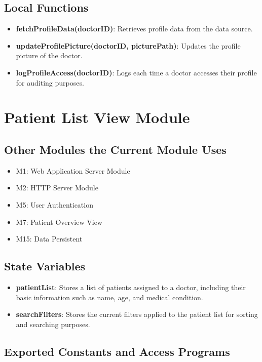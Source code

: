 \documentclass[12pt, titlepage]{article}
\begin{document}
\subsection{Local Functions}
\begin{itemize}
\item \textbf{fetchProfileData(doctorID)}: Retrieves profile data from the data source.
\item \textbf{updateProfilePicture(doctorID, picturePath)}: Updates the profile picture of the doctor.
\item \textbf{logProfileAccess(doctorID)}: Logs each time a doctor accesses their profile for auditing purposes.
\end{itemize}

\section{Patient List View Module}

\subsection{Other Modules the Current Module Uses}
\begin{itemize}
    \item M1: Web Application Server Module
    \item M2: HTTP Server Module
    \item M5: User Authentication
    \item M7: Patient Overview View
    \item M15: Data Persistent
\end{itemize}

\subsection{State Variables}
\begin{itemize}
\item \textbf{patientList}: Stores a list of patients assigned to a doctor, including their basic information such as name, age, and medical condition.
\item \textbf{searchFilters}: Stores the current filters applied to the patient list for sorting and searching purposes.
\end{itemize}

\subsection{Exported Constants and Access Programs}
\end{document}
